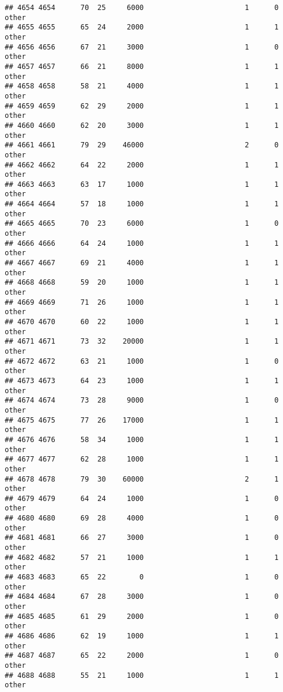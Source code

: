 \documentclass[
]{article}
\begin{document}
\begin{verbatim}
## 4654 4654      70  25     6000                        1      0    other
## 4655 4655      65  24     2000                        1      1    other
## 4656 4656      67  21     3000                        1      0    other
## 4657 4657      66  21     8000                        1      1    other
## 4658 4658      58  21     4000                        1      1    other
## 4659 4659      62  29     2000                        1      1    other
## 4660 4660      62  20     3000                        1      1    other
## 4661 4661      79  29    46000                        2      0    other
## 4662 4662      64  22     2000                        1      1    other
## 4663 4663      63  17     1000                        1      1    other
## 4664 4664      57  18     1000                        1      1    other
## 4665 4665      70  23     6000                        1      0    other
## 4666 4666      64  24     1000                        1      1    other
## 4667 4667      69  21     4000                        1      1    other
## 4668 4668      59  20     1000                        1      1    other
## 4669 4669      71  26     1000                        1      1    other
## 4670 4670      60  22     1000                        1      1    other
## 4671 4671      73  32    20000                        1      1    other
## 4672 4672      63  21     1000                        1      0    other
## 4673 4673      64  23     1000                        1      1    other
## 4674 4674      73  28     9000                        1      0    other
## 4675 4675      77  26    17000                        1      1    other
## 4676 4676      58  34     1000                        1      1    other
## 4677 4677      62  28     1000                        1      1    other
## 4678 4678      79  30    60000                        2      1    other
## 4679 4679      64  24     1000                        1      0    other
## 4680 4680      69  28     4000                        1      0    other
## 4681 4681      66  27     3000                        1      0    other
## 4682 4682      57  21     1000                        1      1    other
## 4683 4683      65  22        0                        1      0    other
## 4684 4684      67  28     3000                        1      0    other
## 4685 4685      61  29     2000                        1      0    other
## 4686 4686      62  19     1000                        1      1    other
## 4687 4687      65  22     2000                        1      0    other
## 4688 4688      55  21     1000                        1      1    other

\end{verbatim}
\end{document}
